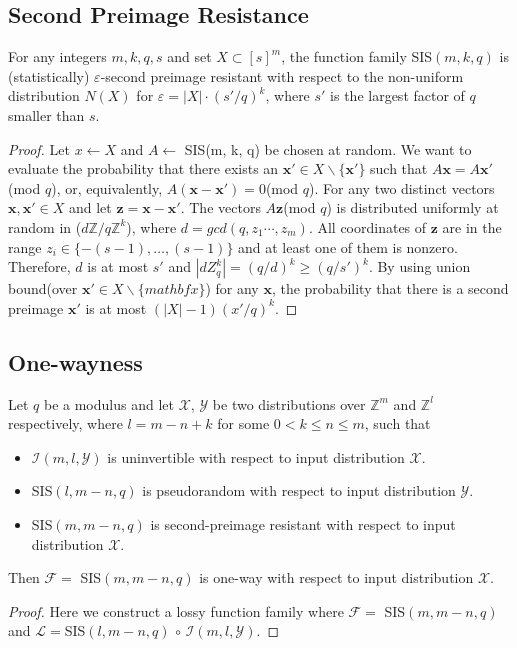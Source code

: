 \documentclass[a4paper]{article}
\theoremstyle{definition}
\theoremstyle{remark}
\renewcommand{\epsilon}{\varepsilon}
\begin{document}
\subsection{Second Preimage Resistance}
\begin{theorem}
  For any integers $m, k, q, s$ and set $X \subset [s]^{m}$, the function family SIS$(m, k, q)$ is 
  (statistically) $\epsilon$-second preimage resistant with respect to the non-uniform distribution $N(X)$
  for $\epsilon = |X|\cdot (s'/q)^{k}$, where $s'$ is the largest factor of $q$ smaller than $s$.
\end{theorem}
\begin{proof}
  Let $x \leftarrow X$ and $A \leftarrow $ SIS(m, k, q) be chosen at random. We want to evaluate the probability 
  that there exists an $\mathbf{x}' \in X  \backslash \{\mathbf{x}'\} $ such that $A\mathbf{x} = A\mathbf{x}'$(mod $q$), or, 
  equivalently, $A(\mathbf{x} - \mathbf{x}') = 0$(mod $q$).
  For any two distinct vectors $\mathbf{x}, \mathbf{x}' \in X$ and let $\mathbf{z} = \mathbf{x} - \mathbf{x}'$.
   The vectors $A\mathbf{z}$(mod $q$) is distributed 
  uniformly at random in ($d\mathbb{Z}/q\mathbb{Z}^{k}$), where $d = gcd(q, z_{1}\cdots,z_{m})$. All coordinates of $\mathbf{z}$
  are in the range $z_{i} \in\{-(s-1), \ldots,(s-1)\}$ and at least one of them is nonzero. Therefore, $d$ is at most $s'$
  and $|dZ_{q}^{k}| = (q/d)^{k} \ge (q/s')^{k}$. By using union bound(over $\mathbf{x}' \in X \backslash \{mathbf{x}\}$)
  for any $\mathbf{x}$, the probability that there is a second preimage $\mathbf{x'}$ is at most $(|X| - 1)(x'/q)^{k}$.
\end{proof}
\subsection{One-wayness}
\begin{theorem}
  Let $q$ be a modulus and let $\mathcal{X}$, $\mathcal{Y}$ be two distributions over $\mathbb{Z}^{m}$ and  $\mathbb{Z}^{l}$
respectively, where $l = m - n + k$ for some $0 < k \le n \le m$, such that 
\begin{itemize}
  \item $\mathcal{I}(m, l, \mathcal{Y})$ is uninvertible with respect to input distribution $\mathcal{X}$.
  \item SIS$(l, m - n, q)$ is pseudorandom with respect to input distribution $\mathcal{Y}$.
  \item SIS$(m, m - n, q)$ is second-preimage resistant with respect to input distribution $\mathcal{X}$.
\end{itemize}
Then $\mathcal{F} = $ SIS$(m, m - n, q)$ is one-way with respect to input distribution $\mathcal{X}$. 
\end{theorem}
\begin{proof}
  Here we construct a lossy function family where $\mathcal{F} = $ SIS$(m, m - n, q)$ and 
  $\mathcal{L} = $SIS$(l, m - n, q)$ $\circ$ $\mathcal{I}(m, l, \mathcal{Y})$.
\end{proof}
\end{document}
